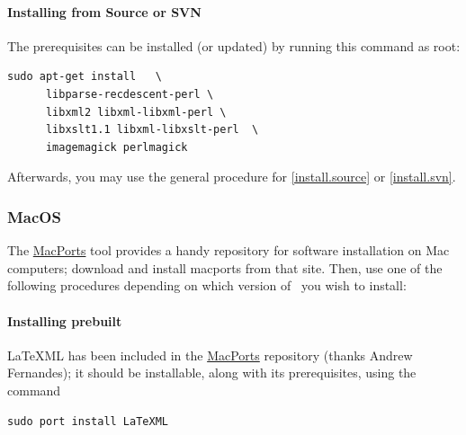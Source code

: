 \documentclass{article}
\begin{document}
\paragraph{Installing from Source or SVN}
The prerequisites can be installed (or updated) by running this command as root: 
\begin{lstlisting}[style=shell]
   sudo apt-get install   \
      libparse-recdescent-perl \
      libxml2 libxml-libxml-perl \
      libxslt1.1 libxml-libxslt-perl  \
      imagemagick perlmagick
\end{lstlisting}
Afterwards, you may use the general procedure for
\ref{install.source} or \ref{install.svn}.


\subsubsection{MacOS}\label{install.macos}
The \href{http://www.macports.org}{MacPorts} tool provides a handy
repository for software installation on Mac computers;
download and install macports from that site.
Then, use one of the following procedures depending on which version
of \LaTeXML\ you wish to install:

\paragraph{Installing prebuilt}
LaTeXML has been included in the \href{http://www.macports.org}{MacPorts}
repository (thanks Andrew Fernandes);
it should be installable, along with its prerequisites, using the command
\begin{lstlisting}[style=shell]
  sudo port install LaTeXML
\end{lstlisting}

\end{document}
